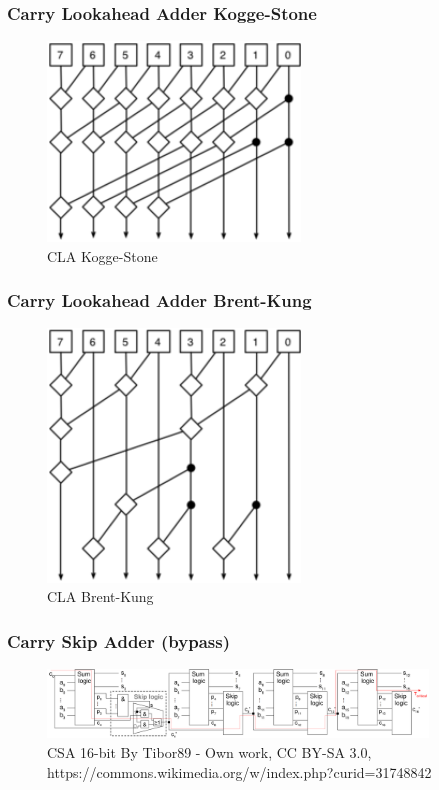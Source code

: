 \begin{frame}
    \frametitle{Carry Lookahead Adder Kogge-Stone}
    \begin{figure}
        \centering
        \includegraphics[width=0.6\textwidth]{media/Kogge-stone-8-bit.png}
        \caption{CLA Kogge-Stone}
    \end{figure}
\end{frame}

\begin{frame}
    \frametitle{Carry Lookahead Adder Brent-Kung}
    \begin{figure}
        \centering
        \includegraphics[width=0.6\textwidth]{media/Brent-kung-8-bit.png}
        \caption{CLA Brent-Kung}
    \end{figure}
\end{frame}

\begin{frame}
    \frametitle{Carry Skip Adder (bypass)}
    \begin{figure}
        \centering
        \includegraphics[width=0.9\textwidth]{media/BCSAdder16Bit.png}
        \caption{CSA 16-bit By Tibor89 - Own work, CC BY-SA 3.0, https://commons.wikimedia.org/w/index.php?curid=31748842}
    \end{figure}
\end{frame}

